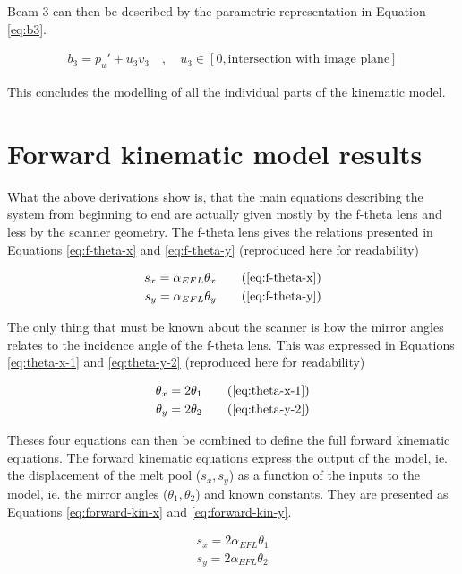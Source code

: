 Beam 3 can then be described by the parametric representation in Equation \ref{eq:b3}.

\begin{align}
    b_3 = p_u' + u_3 v_3 \quad,\quad u_3 \in [0, \text{intersection with image plane}] \label{eq:b3}
\end{align}

This concludes the modelling of all the individual parts of the kinematic model.

\section{Forward kinematic model results}
What the above derivations show is, that the main equations describing the system from beginning to end are actually given mostly by the f-theta lens and less by the scanner geometry. The f-theta lens gives the relations presented in Equations \ref{eq:f-theta-x} and \ref{eq:f-theta-y} (reproduced here for readability)

\begin{align}
    s_x = \alpha_{EFL} \theta_x \tag{\ref{eq:f-theta-x}} \\
    s_y = \alpha_{EFL} \theta_y \tag{\ref{eq:f-theta-y}}
\end{align}

The only thing that must be known about the scanner is how the mirror angles relates to the incidence angle of the f-theta lens. This was expressed in Equations \ref{eq:theta-x-1} and \ref{eq:theta-y-2} (reproduced here for readability)

\begin{align}
    \theta_x = 2\theta_1 \tag{\ref{eq:theta-x-1}} \\
    \theta_y = 2\theta_2 \tag{\ref{eq:theta-y-2}}
\end{align}

Theses four equations can then be combined to define the full forward kinematic equations. The forward kinematic equations express the output of the model, ie. the displacement of the melt pool ($s_x, s_y$) as a function of the inputs to the model, ie. the mirror angles ($\theta_1, \theta_2$) and known constants. They are presented as Equations \ref{eq:forward-kin-x} and \ref{eq:forward-kin-y}.

\begin{align}
    s_x = 2\alpha_{EFL} \theta_1 \label{eq:forward-kin-x} \\
    s_y = 2\alpha_{EFL} \theta_2 \label{eq:forward-kin-y}
\end{align}

